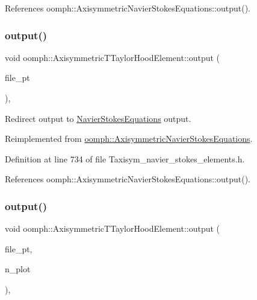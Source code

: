 References oomph\+::\+Axisymmetric\+Navier\+Stokes\+Equations\+::output().

\mbox{\label{classoomph_1_1AxisymmetricTTaylorHoodElement_a0b1f01968fd84b28009339e5e478a683}} 
\subsubsection{\texorpdfstring{output()}{output()}\hspace{0.1cm}{\footnotesize\ttfamily [3/4]}}
{\footnotesize\ttfamily void oomph\+::\+Axisymmetric\+T\+Taylor\+Hood\+Element\+::output (\begin{DoxyParamCaption}\item[{F\+I\+LE $\ast$}]{file\+\_\+pt }\end{DoxyParamCaption})\hspace{0.3cm}{\ttfamily [inline]}, {\ttfamily [virtual]}}



Redirect output to \hyperlink{classoomph_1_1NavierStokesEquations}{Navier\+Stokes\+Equations} output. 



Reimplemented from \hyperlink{classoomph_1_1AxisymmetricNavierStokesEquations_a61129dd7505ac363862946bd8b3ea5bf}{oomph\+::\+Axisymmetric\+Navier\+Stokes\+Equations}.



Definition at line 734 of file Taxisym\+\_\+navier\+\_\+stokes\+\_\+elements.\+h.



References oomph\+::\+Axisymmetric\+Navier\+Stokes\+Equations\+::output().

\mbox{\label{classoomph_1_1AxisymmetricTTaylorHoodElement_abc6435ee0ad7a9235b1fc57451f1872c}} 
\subsubsection{\texorpdfstring{output()}{output()}\hspace{0.1cm}{\footnotesize\ttfamily [4/4]}}
{\footnotesize\ttfamily void oomph\+::\+Axisymmetric\+T\+Taylor\+Hood\+Element\+::output (\begin{DoxyParamCaption}\item[{F\+I\+LE $\ast$}]{file\+\_\+pt,  }\item[{const unsigned \&}]{n\+\_\+plot }\end{DoxyParamCaption})\hspace{0.3cm}{\ttfamily [inline]}, {\ttfamily [virtual]}}




